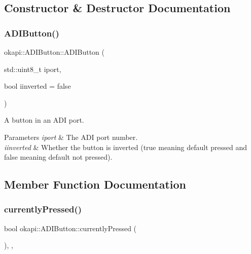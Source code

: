 \subsection{Constructor \& Destructor Documentation}
\mbox{\label{classokapi_1_1ADIButton_a84065174f1fd89bfb1aba7634c4c36d9}} 
\subsubsection{\texorpdfstring{ADIButton()}{ADIButton()}}
{\footnotesize\ttfamily okapi\+::\+A\+D\+I\+Button\+::\+A\+D\+I\+Button (\begin{DoxyParamCaption}\item[{std\+::uint8\+\_\+t}]{iport,  }\item[{bool}]{iinverted = {\ttfamily false} }\end{DoxyParamCaption})}

A button in an A\+DI port.


\begin{DoxyParams}{Parameters}
{\em iport} & The A\+DI port number. \\
\hline
{\em iinverted} & Whether the button is inverted ({\ttfamily true} meaning default pressed and {\ttfamily false} meaning default not pressed). \\
\hline
\end{DoxyParams}


\subsection{Member Function Documentation}
\mbox{\label{classokapi_1_1ADIButton_af37e345e8239a572021c0b0b31f859aa}} 
\subsubsection{\texorpdfstring{currentlyPressed()}{currentlyPressed()}}
{\footnotesize\ttfamily bool okapi\+::\+A\+D\+I\+Button\+::currently\+Pressed (\begin{DoxyParamCaption}{ }\end{DoxyParamCaption})\hspace{0.3cm}{\ttfamily [override]}, {\ttfamily [protected]}, {\ttfamily [virtual]}}



